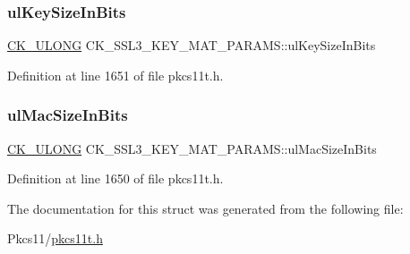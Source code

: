 \subsubsection{\texorpdfstring{ul\+Key\+Size\+In\+Bits}{ulKeySizeInBits}}
{\footnotesize\ttfamily \hyperlink{pkcs11t_8h_a35181858a3b7a0a81f49d180d8f446ef}{C\+K\+\_\+\+U\+L\+O\+NG} C\+K\+\_\+\+S\+S\+L3\+\_\+\+K\+E\+Y\+\_\+\+M\+A\+T\+\_\+\+P\+A\+R\+A\+M\+S\+::ul\+Key\+Size\+In\+Bits}



Definition at line 1651 of file pkcs11t.\+h.

\mbox{\label{struct_c_k___s_s_l3___k_e_y___m_a_t___p_a_r_a_m_s_a02e30c07929506f8a878a24349d99066}} 
\subsubsection{\texorpdfstring{ul\+Mac\+Size\+In\+Bits}{ulMacSizeInBits}}
{\footnotesize\ttfamily \hyperlink{pkcs11t_8h_a35181858a3b7a0a81f49d180d8f446ef}{C\+K\+\_\+\+U\+L\+O\+NG} C\+K\+\_\+\+S\+S\+L3\+\_\+\+K\+E\+Y\+\_\+\+M\+A\+T\+\_\+\+P\+A\+R\+A\+M\+S\+::ul\+Mac\+Size\+In\+Bits}



Definition at line 1650 of file pkcs11t.\+h.



The documentation for this struct was generated from the following file\+:\begin{DoxyCompactItemize}
\item 
Pkcs11/\hyperlink{pkcs11t_8h}{pkcs11t.\+h}\end{DoxyCompactItemize}
